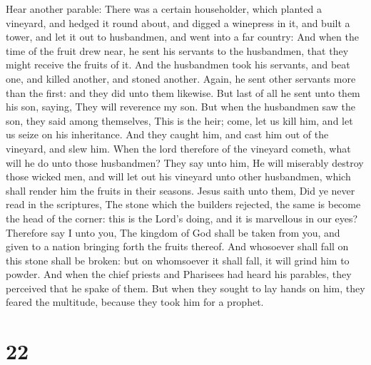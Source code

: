 Hear another parable: There was a certain householder,
which planted a vineyard, and hedged it round about, and digged a
winepress in it, and built a tower, and let it out to husbandmen, and
went into a far country:  And when the time of the fruit
drew near, he sent his servants to the husbandmen, that they might
receive the fruits of it.  And the husbandmen took his
servants, and beat one, and killed another, and stoned another.
 Again, he sent other servants more than the first: and
they did unto them likewise.  But last of all he sent
unto them his son, saying, They will reverence my son. 
But when the husbandmen saw the son, they said among themselves, This is
the heir; come, let us kill him, and let us seize on his inheritance.
 And they caught him, and cast him out of the vineyard,
and slew him.  When the lord therefore of the vineyard
cometh, what will he do unto those husbandmen?  They say
unto him, He will miserably destroy those wicked men, and will let out
his vineyard unto other husbandmen, which shall render him the fruits in
their seasons.  Jesus saith unto them, Did ye never read
in the scriptures, The stone which the builders rejected, the same is
become the head of the corner: this is the Lord's doing, and it is
marvellous in our eyes?  Therefore say I unto you, The
kingdom of God shall be taken from you, and given to a nation bringing
forth the fruits thereof.  And whosoever shall fall on
this stone shall be broken: but on whomsoever it shall fall, it will
grind him to powder.  And when the chief priests and
Pharisees had heard his parables, they perceived that he spake of them.
 But when they sought to lay hands on him, they feared
the multitude, because they took him for a prophet.

\hypertarget{section-21}{%
\section{22}\label{section-21}}

